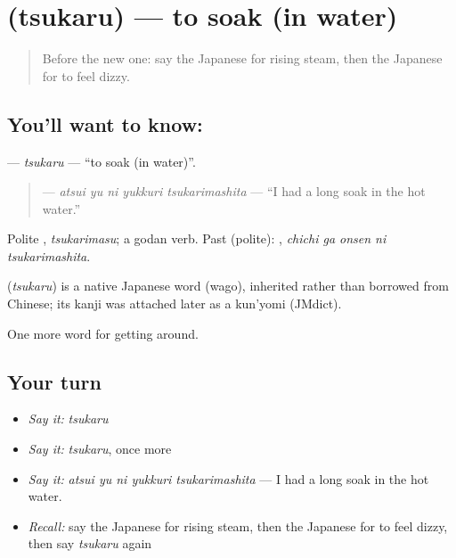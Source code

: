 \section[\texorpdfstring{\ja{つかる} (tsukaru)}{つかる (tsukaru)}]{ (tsukaru) — to soak (in water)}

\label{lesson:JA-C398-tsukaru}



\begin{quote}
Before the new one: say the Japanese for rising steam, then the Japanese for to feel dizzy.
\end{quote}

\subsection*{You'll want to know: }
\textbf{} — \emph{tsukaru} — \textquotedblleft{}to soak (in water)\textquotedblright{}.

\begin{quote}
\textbf{   } — \emph{atsui yu ni yukkuri tsukarimashita} — \textquotedblleft{}I had a long soak in the hot water.\textquotedblright{}
\end{quote}

Polite \textbf{}, \emph{tsukarimasu}; a godan verb. Past (polite): \textbf{  }, \emph{chichi ga onsen ni tsukarimashita}.

\begin{cousinweb}
\textbf{} (\emph{tsukaru}) is a native Japanese word (wago), inherited rather than borrowed from Chinese; its kanji was attached later as a kun'yomi (JMdict).
\end{cousinweb}

\begin{grammarlens}[title={What you've built}]
One more word for getting around.
\end{grammarlens}

\subsection*{Your turn}
\begin{itemize}
\raggedright
  \item \emph{Say it:} \emph{tsukaru}
  \item \emph{Say it:} \emph{tsukaru}, once more
  \item \emph{Say it:} \emph{atsui yu ni yukkuri tsukarimashita} — I had a long soak in the hot water.
  \item \emph{Recall:} say the Japanese for rising steam, then the Japanese for to feel dizzy, then say \emph{tsukaru} again
\end{itemize}

